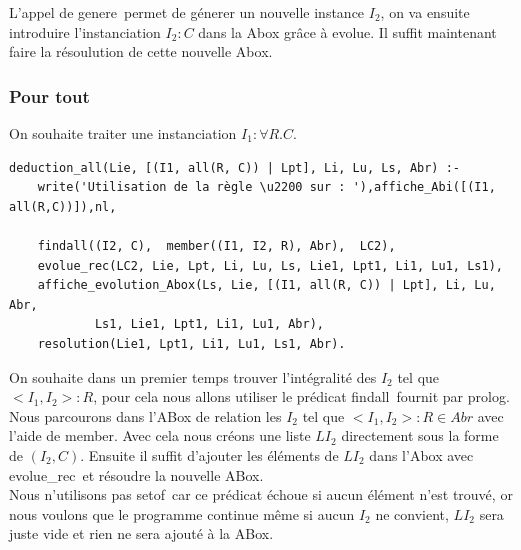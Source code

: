 \documentclass{article}
\begin{document}
L'appel de \color{blue}genere\color{black}\ permet de génerer un nouvelle instance $I_2$, on va ensuite introduire l'instanciation $I_2:C$ dans la Abox grâce à \color{blue}evolue\color{black}. Il suffit maintenant faire la résoulution de cette nouvelle Abox.

\subsubsection{Pour tout}

On souhaite traiter une instanciation $I_1:\forall R.C$.
\begin{verbatim}
deduction_all(Lie, [(I1, all(R, C)) | Lpt], Li, Lu, Ls, Abr) :-
	write('Utilisation de la règle \u2200 sur : '),affiche_Abi([(I1, all(R,C))]),nl,
 
	findall((I2, C),  member((I1, I2, R), Abr),  LC2), 
	evolue_rec(LC2, Lie, Lpt, Li, Lu, Ls, Lie1, Lpt1, Li1, Lu1, Ls1),
	affiche_evolution_Abox(Ls, Lie, [(I1, all(R, C)) | Lpt], Li, Lu, Abr,
            Ls1, Lie1, Lpt1, Li1, Lu1, Abr), 
	resolution(Lie1, Lpt1, Li1, Lu1, Ls1, Abr).
\end{verbatim}

On souhaite dans un premier temps trouver l'intégralité des $I_2$ tel que $<I_1,I_2>:R$, pour cela nous allons utiliser le prédicat \color{blue}findall\color{black}\ fournit par prolog. Nous parcourons dans l'ABox de relation les $I_2$ tel que $<I_1,I_2>:R\in Abr$ avec l'aide de \color{blue}member\color{black}. Avec cela nous créons une liste $LI_2$ directement sous la forme de $(I_2,C)$. Ensuite il suffit d'ajouter les éléments de $LI_2$ dans l'Abox avec \color{blue}evolue\_rec\color{black}\ et résoudre la nouvelle ABox.\\

Nous n'utilisons pas \color{blue}setof\color{black}\ car ce prédicat échoue si aucun élément n'est trouvé, or nous voulons que le programme continue même si aucun $I_2$ ne convient, $LI_2$ sera juste vide et rien ne sera ajouté à la ABox.
\end{document}
